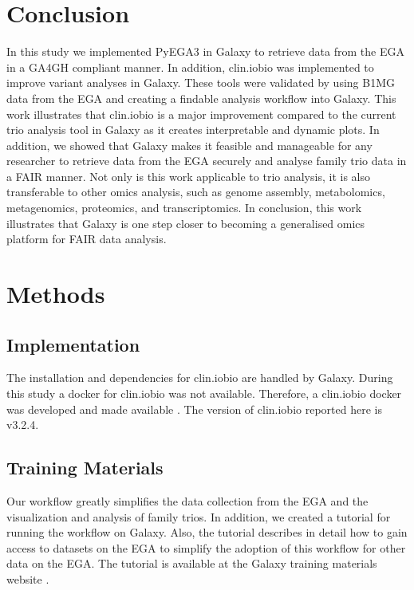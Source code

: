 \section*{Conclusion}
In this study we implemented PyEGA3 in Galaxy to retrieve data from the EGA in a GA4GH compliant manner. In addition, clin.iobio was implemented to improve variant analyses in Galaxy. These tools were validated by using B1MG data from the EGA and creating a findable analysis workflow into Galaxy. This work illustrates that clin.iobio is a major improvement compared to the current trio analysis tool in Galaxy as it creates interpretable and dynamic plots. In addition, we showed that Galaxy makes it feasible and manageable for any researcher to retrieve data from the EGA securely and analyse family trio data in a FAIR manner. Not only is this work applicable to trio analysis, it is also transferable to other omics analysis, such as genome assembly, metabolomics, metagenomics, proteomics, and transcriptomics. In conclusion, this work illustrates that Galaxy is one step closer to becoming a generalised omics platform for FAIR data analysis.

\section*{Methods}
\subsection*{Implementation}
The installation and dependencies for clin.iobio are handled by Galaxy. During this study a docker for clin.iobio was not available. Therefore, a clin.iobio docker was developed and made available \cite{iobio_docker}. The version of clin.iobio reported here is v3.2.4.

\subsection*{Training Materials}
Our workflow greatly simplifies the data collection from the EGA and the visualization and analysis of family trios. In addition, we created a tutorial for running the workflow on Galaxy. Also, the tutorial describes in detail how to gain access to datasets on the EGA to simplify the adoption of this workflow for other data on the EGA. The tutorial is available at the Galaxy training materials website \cite{tutorial}.

